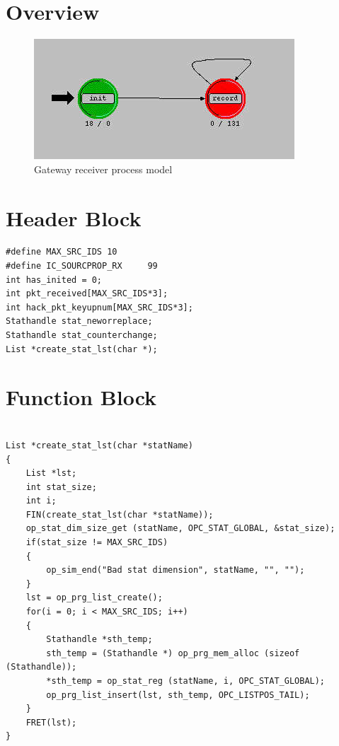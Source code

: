 

\section{Overview}
\begin{figure}[ht]
    \centering
    \includegraphics[scale=0.6]{images/gateway_rcvr}
    \caption{Gateway receiver process model}
    \label{fig:appendix-f}
\end{figure}

\newpage

\section{Header Block}
{\tiny
\begin{verbatim}
#define MAX_SRC_IDS	10
#define IC_SOURCPROP_RX 	99
int has_inited = 0;
int pkt_received[MAX_SRC_IDS*3];
int hack_pkt_keyupnum[MAX_SRC_IDS*3];
Stathandle stat_neworreplace;
Stathandle stat_counterchange;
List *create_stat_lst(char *);

\end{verbatim}
}

\section{Function Block}
{\tiny
\begin{verbatim}

List *create_stat_lst(char *statName)
{
	List *lst;
	int stat_size;
	int i;
	FIN(create_stat_lst(char *statName));
	op_stat_dim_size_get (statName, OPC_STAT_GLOBAL, &stat_size);
	if(stat_size != MAX_SRC_IDS)
	{
		op_sim_end("Bad stat dimension", statName, "", "");
	}
	lst = op_prg_list_create();
	for(i = 0; i < MAX_SRC_IDS; i++)
	{
		Stathandle *sth_temp;
		sth_temp = (Stathandle *) op_prg_mem_alloc (sizeof (Stathandle));
		*sth_temp = op_stat_reg (statName, i, OPC_STAT_GLOBAL);
		op_prg_list_insert(lst, sth_temp, OPC_LISTPOS_TAIL);
	}
	FRET(lst);
}

\end{verbatim}
}
